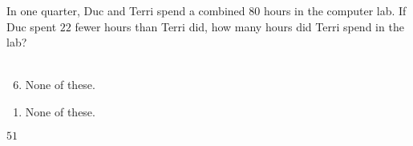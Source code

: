  
In one quarter, Duc and Terri spend a combined $80$ hours in the computer lab.  If Duc spent $22$ fewer hours than Terri did, how many hours did Terri spend in the lab?\\ \\


\ifsat
	\begin{enumerate}[label=\Alph*)]
	\end{enumerate}
\else
\fi

\ifacteven
	\begin{enumerate}[label=\textbf{\Alph*.},itemsep=\fill,align=left]
		\setcounter{enumii}{5}
		\item None of these. 
	\end{enumerate}
\else
\fi

\ifactodd
	\begin{enumerate}[label=\textbf{\Alph*.},itemsep=\fill,align=left]
		\item None of these. 
	\end{enumerate}
\else
\fi

\ifgridin
$51$
\else
\fi

